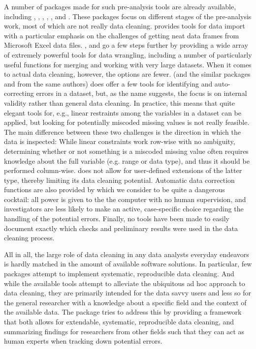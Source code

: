 \documentclass[article,shortnames]{jss}
\begin{document}
A number of  packages made for such pre-analysis tools are
already available, including  \citep{janitor}, 
\citep{plyr},  \citep{data.table}, 
\citep{DataCombine} ,  \citep{validate}, and
 \citep{DataExplorer}. These packages focus on
different stages of the pre-analysis work, most of which are not
really data cleaning.   provides tools for data import
with a particular emphasis on the challenges of getting neat data
frames from Microsoft Excel data files. , 
and  go a few steps further by providing a wide array
of extremely powerful tools for data wrangling, including a number of
particularly useful functions for merging and working with very large
datasets. When it comes to actual data cleaning, however, the options
are fewer.   (and the similar packages 
\citep{editrules} and  \citep{deducorrect} from the
same authors) does offer a few tools for identifying and
auto-correcting errors in a dataset, but, as the name suggests, the
focus is on internal validity rather than general data cleaning. In
practice, this means that quite elegant tools for, e.g., linear
restraints among the variables in a dataset can be applied, but
looking for potentially miscoded missing values is not really
feasible. The main difference between these two challenges is the
direction in which the data is inspected: While linear constraints
work row-wise with no ambiguity, determining whether or not something
is a miscoded missing value often requires knowledge about the full
variable (e.g. range or data type), and thus it should be performed
column-wise.  does not allow for user-defined extensions
of the latter type, thereby limiting its data cleaning potential.
Automatic data correction functions are also provided by
 which we consider to be quite a dangerous cocktail: all
power is given to the the computer with no human supervision, and
investigators are less likely to make an active, case-specific choice
regarding the handling of the potential errors.  Finally, no tools
have been made to easily document exactly which checks and preliminary
results were used in the data cleaning process.

All in all, the large role of data cleaning in any data analysts
everyday endeavors is hardly matched in the amount of available
 software solutions. In particular, few packages attempt
to implement systematic, reproducible data cleaning. And while the
available tools attempt to alleviate the ubiquitous ad hoc approach to
data cleaning, they are primarily intended for the data savvy users
and less so for the general researcher with a knowledge about a
specific field and the context of the available data. The
 package \citep{dataMaid} tries to address this by
providing a framework that both allows for extendable, systematic,
reproducible data cleaning, and summarizing findings for researchers
from other fields such that they can act as human experts when
tracking down potential errors.
\end{document}
